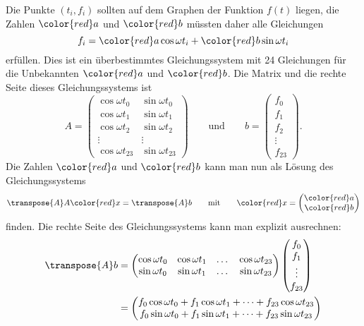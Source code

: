 
\begin{loesung}
Die Punkte $(t_i,f_i)$ sollten auf dem Graphen der Funktion $f(t)$ liegen,
die Zahlen $\color{red}a$ und $\color{red}b$ müssten daher alle Gleichungen
\[
f_i = {\color{red}a}\cos\omega t_i + {\color{red}b} \sin\omega t_i
\]
erfüllen.
Dies ist ein überbestimmtes Gleichungssystem mit 24 Gleichungen für 
die Unbekannten $\color{red}a$ und $\color{red}b$.
Die Matrix und die rechte Seite dieses Gleichungssystems ist
\[
A
=
\begin{pmatrix}
\cos \omega t_0&\sin\omega t_0\\
\cos \omega t_1&\sin\omega t_1\\
\cos \omega t_2&\sin\omega t_2\\
\vdots         &\vdots        \\
\cos \omega t_{23}&\sin\omega t_{23}
\end{pmatrix}
\qquad
\text{und}
\qquad
b
=
\begin{pmatrix}
f_0\\
f_1\\
f_2\\
\vdots\\
f_{23}
\end{pmatrix}.
\]
Die Zahlen $\color{red}a$ und $\color{red}b$ kann man nun als Lösung
des Gleichungssystems
\[
\transpose{A}A{\color{red}x}=\transpose{A}b
\qquad\text{mit}\qquad
{\color{red}x}
=
\begin{pmatrix}
\color{red}a\\
\color{red}b
\end{pmatrix}
\]
finden.
Die rechte Seite des Gleichungssystems kann man explizit ausrechnen:
\begin{align*}
\transpose{A}b
&=
\begin{pmatrix}
\cos\omega t_0&\cos\omega t_1&\dots&\cos\omega t_{23}\\
\sin\omega t_0&\sin\omega t_1&\dots&\sin\omega t_{23}
\end{pmatrix}
\begin{pmatrix}
f_0\\f_1\\\vdots\\f_{23}
\end{pmatrix}
\\
&=
\begin{pmatrix}
f_0\cos\omega t_0 + f_1\cos\omega t_1+\dots+f_{23}\cos\omega t_{23}\\
f_0\sin\omega t_0 + f_1\sin\omega t_1+\dots+f_{23}\sin\omega t_{23}

\end{pmatrix}
\end{align*}
\end{loesung}
